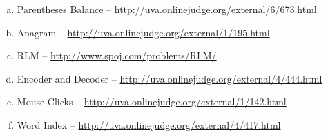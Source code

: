 \begin{enumerate}[1 -]
\begin{enumerate}[a)]
		\item Parentheses Balance -- \href{http://uva.onlinejudge.org/external/6/673.html}{http://uva.onlinejudge.org/external/6/673.html}
		\item Anagram -- \href{http://uva.onlinejudge.org/external/1/195.html}{http://uva.onlinejudge.org/external/1/195.html}
		\item RLM -- \href{http://www.spoj.com/problems/RLM/}{http://www.spoj.com/problems/RLM/}
		\item Encoder and Decoder -- \href{http://uva.onlinejudge.org/external/4/444.html}{http://uva.onlinejudge.org/external/4/444.html}
		\item Mouse Clicks -- \href{http://uva.onlinejudge.org/external/1/142.html}{http://uva.onlinejudge.org/external/1/142.html}	
		\item Word Index -- \href{http://uva.onlinejudge.org/external/4/417.html}{http://uva.onlinejudge.org/external/4/417.html}
	\end{enumerate}


\end{enumerate}


